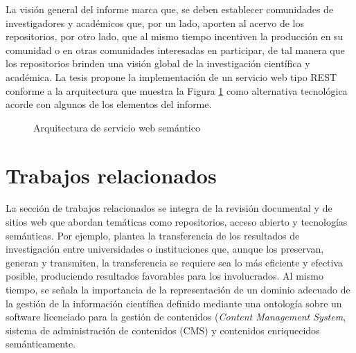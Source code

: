 La visi\'on general del informe marca que, se deben establecer comunidades de investigadores y acad\'emicos que, por un lado, aporten al acervo de los repositorios, por otro lado, que al mismo tiempo incentiven la producci\'on en su comunidad o en otras comunidades interesadas en participar, de tal manera que los repositorios brinden una visi\'on global de la investigaci\'on cient\'ifica y acad\'emica. La tesis propone la implementaci\'on de un servicio web tipo REST conforme a la arquitectura que muestra la Figura \ref{arquitect1} como alternativa tecnol\'ogica acorde con algunos de los elementos del informe.

\begin{figure}[!ht]
    \centering
    \caption{Arquitectura de servicio web sem\'antico} %
    \label{arquitect1}
\end{figure}

\section{Trabajos relacionados}

La secci\'on de trabajos relacionados se integra de la revisi\'on documental y de sitios web que abordan tem\'aticas como repositorios, acceso abierto y tecnolog\'ias sem\'anticas. Por ejemplo, \cite{DrJulioSoler} plantea la transferencia de los resultados de investigaci\'on entre universidades o instituciones que, aunque los preservan, generan y transmiten, la transferencia se requiere sea lo m\'as eficiente y efectiva posible, produciendo resultados favorables para los involucrados. Al mismo tiempo, se se\~{n}ala la importancia de la representaci\'on de un dominio adecuado de la gesti\'on de la informaci\'on cient\'ifica definido mediante una ontolog\'ia sobre un software licenciado para la gesti\'on de contenidos (\emph{Content Management System}, sistema de administraci\'on de contenidos (CMS) y contenidos enriquecidos sem\'anticamente.\newline 

